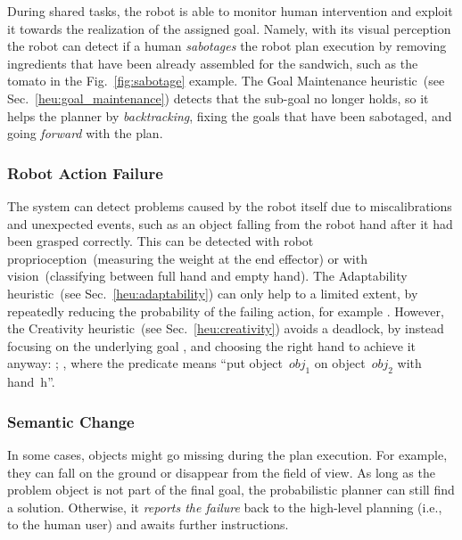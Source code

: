 During \hr{} shared tasks, the robot is able to monitor human intervention and exploit it towards the realization of the assigned goal.
Namely, with its visual perception the robot can detect if a human \emph{sabotages} the robot plan execution by removing ingredients that have been already assembled for the sandwich, such as the tomato in the Fig.~\ref{fig:sabotage} example.
The Goal Maintenance heuristic~(see Sec.~\ref{heu:goal_maintenance}) detects that the sub-goal  no longer holds, so it helps the planner by \emph{backtracking}, fixing the goals that have been sabotaged, and going \emph{forward} with the plan.

\subsubsection{Robot Action Failure}

The system can detect problems caused by the robot itself due to miscalibrations and unexpected events, such as an object falling from the robot hand after it had been grasped correctly.
This can be detected with robot proprioception~(measuring the weight at the end effector) or with vision~(classifying between full hand and empty hand). The Adaptability heuristic~(see Sec.~\ref{heu:adaptability}) can only help to a limited extent, by repeatedly reducing the probability of the failing action, for example .
However, the Creativity heuristic~(see Sec.~\ref{heu:creativity}) avoids a deadlock, by instead focusing on the underlying goal , and choosing the right hand to achieve it anyway: ; , where the predicate  means ``put object~$obj_1$ on object~$obj_2$ with hand~h''.

\subsubsection{Semantic Change}

In some cases, objects might go missing during the plan execution.
For example, they can fall on the ground or disappear from the field of view.
As long as the problem object is not part of the final goal, the probabilistic planner can still find a solution.
Otherwise, it \emph{reports the failure} back to the high-level planning (i.e., to the human user) and awaits further instructions.

